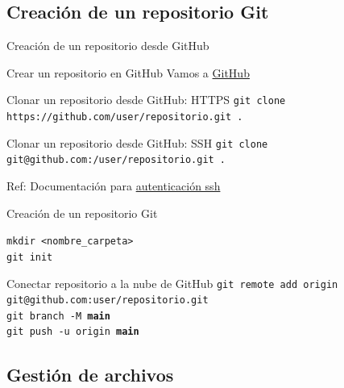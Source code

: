 \documentclass{beamer}
\begin{document}
\subsection {Creación de un repositorio Git}
  
\begin{frame}[containsverbatim]{Creación de un repositorio desde GitHub}

\begin{block}{Crear un repositorio en GitHub}
  Vamos a \href{https://github.com}{GitHub} 
\end{block}


\begin{block}{Clonar un repositorio desde GitHub: HTTPS}
  \small
  \texttt{git clone https://github.com/user/repositorio.git .}
\end{block}

\begin{block}{Clonar un repositorio desde GitHub: SSH}
  \small
  \texttt{git clone git@github.com:/user/repositorio.git .}
\end{block}

Ref: Documentación para \href{https://docs.github.com/es/authentication/connecting-to-github-with-ssh/about-ssh}{autenticación ssh}

\end{frame}


\begin{frame}[containsverbatim] {Creación de un repositorio Git}  

\begin{block}{}

  \texttt{mkdir <nombre\_carpeta>} \\ 
  \texttt{git init}

\end{block}

\begin{block}{Conectar repositorio a la nube de GitHub}
  \small 
  \texttt{git remote add origin git@github.com:user/repositorio.git} \\ 
  \texttt{git branch -M \textbf{main}} \\
  \texttt{git push -u origin \textbf{main}}

\end{block}


\end{frame}

\subsection {Gestión de archivos}
\end{document}
